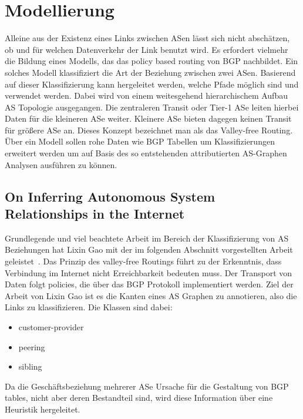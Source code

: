 \section{Modellierung}\label{sec:modellierung}

Alleine aus der Existenz eines Links zwischen ASen lässt sich nicht abschätzen, ob und für welchen Datenverkehr der Link benutzt wird.
Es erfordert vielmehr die Bildung eines Modells, das das policy based routing von BGP nachbildet.
Ein solches Modell klassifiziert die Art der Beziehung zwischen zwei ASen.
Basierend auf dieser Klassifizierung kann hergeleitet werden, welche Pfade möglich sind und verwendet werden.
Dabei wird von einem weitesgehend hierarchischem Aufbau AS Topologie ausgegangen.
Die zentraleren Transit oder Tier-1 ASe leiten hierbei Daten für die kleineren ASe weiter.
Kleinere ASe bieten dagegen keinen Transit für größere ASe an.
Dieses Konzept bezeichnet man als das Valley-free Routing.
Über ein Modell sollen rohe Daten wie BGP Tabellen um Klassifizierungen erweitert werden um auf Basis des so entstehenden attributierten AS-Graphen Analysen ausführen zu können.

\subsection{On Inferring Autonomous System Relationships in the Internet}
Grundlegende und viel beachtete Arbeit im Bereich der Klassifizierung von AS Beziehungen hat Lixin Gao mit der im folgenden Abschnitt vorgestellten Arbeit geleistet~\cite{Gao:2001:IAS:504611.504616}.
Das Prinzip des valley-free Routings führt zu der Erkenntnis, dass Verbindung im Internet nicht Erreichbarkeit bedeuten muss.
Der Transport von Daten folgt policies, die über das BGP Protokoll implementiert werden.
Ziel der Arbeit von Lixin Gao ist es die Kanten eines AS Graphen zu annotieren, also die Links zu klassifizieren.
Die Klassen sind dabei:
\begin{itemize}
  \item customer-provider
  \item peering
  \item sibling
\end{itemize}
Da die Geschäftsbeziehung mehrerer ASe Ursache für die Gestaltung von BGP tables, nicht aber deren Bestandteil sind, wird diese Information über eine Heuristik hergeleitet.


